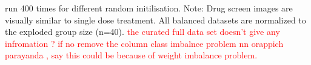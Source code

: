 \begin{table}[H]
\centering
\caption{Summary of Datasets}
\label{tab:dataset_summary}
\end{table}

    

run 400 times for different random initilisation. Note: Drug screen images are visually similar to single dose treatment. All balanced datasets
 are normalized to the exploded group size (n=40).
 \textcolor{red}{the curated full data set doesn't give any infromation ? if no remove the column}
 \textcolor{red}{class imbalnce problem nn orappich parayanda , say this could be  because of weight imbalance problem.}

